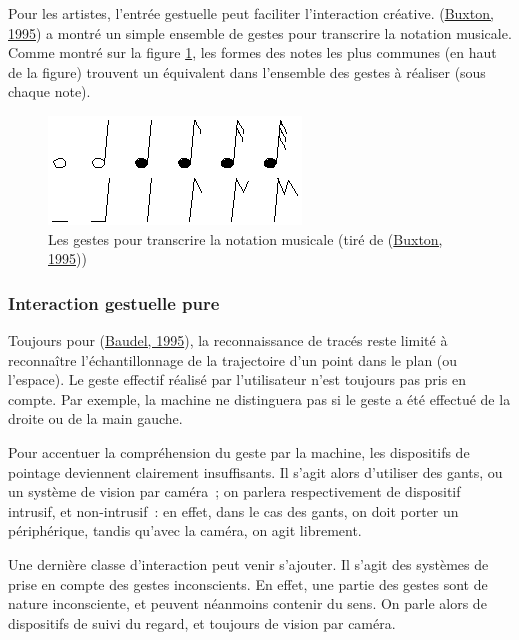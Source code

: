 \documentclass[
]{book}
\begin{document}
Pour les artistes, l'entrée gestuelle peut faciliter l'interaction
créative. (\protect\hyperlink{ref-buxton1995chunking}{Buxton, 1995}) a montré un
simple ensemble de gestes pour transcrire la notation musicale. Comme montré
sur la figure \ref{fig:gestes2}, les formes des notes les plus communes (en haut de la
figure) trouvent un équivalent dans l'ensemble des gestes à réaliser (sous
chaque note).

\begin{figure}
\centering
\includegraphics{img/BarfieldF17.png}
\caption{\label{fig:gestes2}Les gestes pour transcrire la notation musicale (tiré de
(\protect\hyperlink{ref-buxton1995chunking}{Buxton, 1995}))}
\end{figure}

\hypertarget{interaction-gestuelle-pure}{%
\subsubsection{Interaction gestuelle pure}\label{interaction-gestuelle-pure}}

Toujours pour (\protect\hyperlink{ref-baudel1995aspects}{Baudel, 1995}), la
reconnaissance de tracés reste limité à reconnaître l'échantillonnage de la
trajectoire d'un point dans le plan (ou l'espace). Le geste effectif réalisé
par l'utilisateur n'est toujours pas pris en compte. Par exemple, la machine
ne distinguera pas si le geste a été effectué de la droite ou de la main
gauche.

Pour accentuer la compréhension du geste par la machine, les dispositifs
de pointage deviennent clairement insuffisants. Il s'agit alors d'utiliser
des gants, ou un système de vision par caméra~; on parlera respectivement de
dispositif intrusif, et non-intrusif~: en effet, dans le cas des gants, on
doit porter un périphérique, tandis qu'avec la caméra, on agit librement.

Une dernière classe d'interaction peut venir s'ajouter. Il s'agit des
systèmes de prise en compte des gestes inconscients. En effet, une partie des
gestes sont de nature inconsciente, et peuvent néanmoins contenir du sens. On
parle alors de dispositifs de suivi du regard, et toujours de vision par
caméra.
\end{document}

